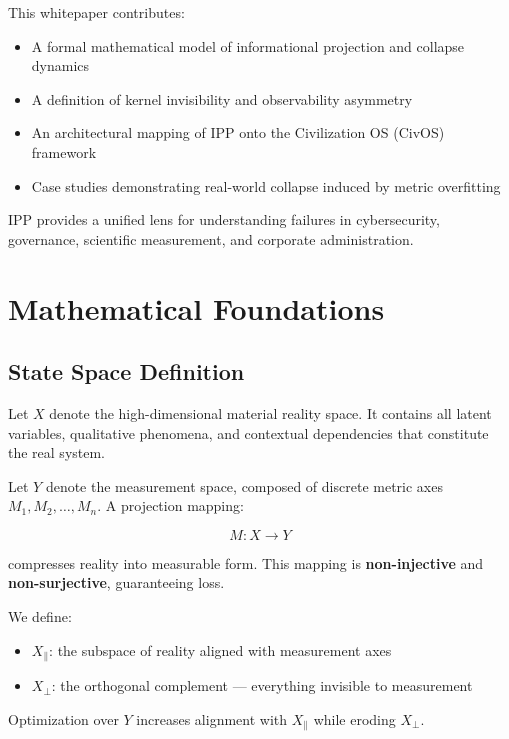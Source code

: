 \documentclass[11pt]{article}
\begin{document}
This whitepaper contributes:

\begin{itemize}[leftmargin=1.5em]
    \item A formal mathematical model of informational projection and collapse dynamics
    \item A definition of kernel invisibility and observability asymmetry
    \item An architectural mapping of IPP onto the Civilization OS (CivOS) framework
    \item Case studies demonstrating real-world collapse induced by metric overfitting
\end{itemize}

IPP provides a unified lens for understanding failures in cybersecurity, governance, scientific measurement, and corporate administration.

\section{Mathematical Foundations}

\subsection{State Space Definition}

Let $X$ denote the high-dimensional material reality space.
It contains all latent variables, qualitative phenomena, and contextual dependencies that constitute the real system.

Let $Y$ denote the measurement space, composed of discrete metric axes
$M_1, M_2, \ldots, M_n$.
A projection mapping:

\[
M : X \rightarrow Y
\]

compresses reality into measurable form.
This mapping is \textbf{non-injective} and \textbf{non-surjective}, guaranteeing loss.

We define:

\begin{itemize}[leftmargin=1.5em]
    \item $X_{\parallel}$: the subspace of reality aligned with measurement axes
    \item $X_{\perp}$: the orthogonal complement --- everything invisible to measurement
\end{itemize}

Optimization over $Y$ increases alignment with $X_{\parallel}$ while eroding $X_{\perp}$.
\end{document}
